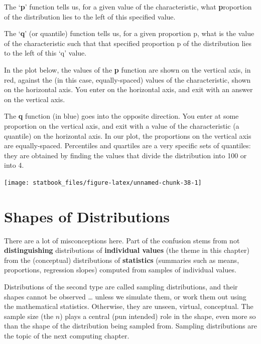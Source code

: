 \documentclass[]{book}
\begin{document}
The `\textbf{p}' function tells us, for a given value of the characteristic, what \textbf{p}roportion of the distribution lies to the left of this specified value.

The `\textbf{q}' (or quantile) function tells us, for a given proportion p, what is the value of the characteristic such that that specified proportion p of the distribution lies to the left of this `q' value.

In the plot below, the values of the \textbf{p} function are shown on the vertical axis, in red, against the (in this case, equally-spaced) values of the characteristic, shown on the horizontal axis. You enter on the horizontal axis, and exit with an answer on the vertical axis.

The \textbf{q} function (in blue) goes into the opposite direction. You enter at some proportion on the vertical axis, and exit with a value of the characteristic (a quantile) on the horizontal axis. In our plot, the proportions on the vertical axis are equally-spaced. Percentiles and quartiles are a very specific sets of quantiles: they are obtained by finding the values that divide the distribution into 100 or into 4.

\begin{center}\texttt{[image: statbook\_files/figure-latex/unnamed-chunk-38-1]} \end{center}

\hypertarget{shapes-of-distributions}{%
\section{Shapes of Distributions}\label{shapes-of-distributions}}

There are a lot of misconceptions here. Part of the confusion stems from not \textbf{distinguishing} distributions of \textbf{individual values} (the theme in this chapter) from the (conceptual) distributions of \textbf{statistics} (summaries such as means, proportions, regression slopes) computed from samples of individual values.

Distributions of the second type are called sampling distributions, and their shapes cannot be observed \ldots{} unless we simulate them, or work them out using the mathematical statistics. Otherwise, they are unseen, virtual, conceptual. The sample size (the \(n\)) plays a central (pun intended) role in the shape, even more so than the shape of the distribution being sampled from. Sampling distributions are the topic of the next computing chapter.
\end{document}
